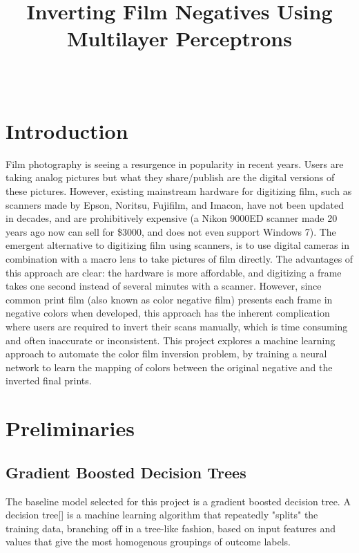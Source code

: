 \documentclass[twoside,11pt]{article}
\begin{document}
\title{Inverting Film Negatives Using Multilayer Perceptrons
}

\author{
		 \\
	}


\maketitle

\section{Introduction}
\label{sec:intro}
Film photography is seeing a resurgence in popularity in recent years. Users are taking analog pictures 
but what they share/publish are the digital versions of these pictures. However, existing mainstream hardware for digitizing 
film, such as scanners made by Epson, Noritsu, Fujifilm, and Imacon, have not been updated in decades, and are prohibitively expensive 
(a Nikon 9000ED scanner made 20 years ago now can sell for \$3000, and does not even support Windows 7).
The emergent alternative to digitizing film using scanners, is to use digital cameras in combination with a macro lens to take pictures 
of film directly. The advantages of this approach are clear: the hardware is more affordable, and digitizing a frame takes one second instead of 
several minutes with a scanner. However, since common print film (also known as color negative film) presents each frame in negative colors when developed, 
this approach has the inherent complication where users are required to invert their scans manually, which is time consuming and often inaccurate or inconsistent.
This project explores a machine learning approach to automate the color film inversion problem, by training a neural network to learn the mapping of colors between 
the original negative and the inverted final prints.

\section{Preliminaries}
\subsection{Gradient Boosted Decision Trees}
The baseline model selected for this project is a gradient boosted decision tree. A decision tree[\cite{breiman1984classification}] is a machine learning 
algorithm that repeatedly "splits" the training data, branching off in a tree-like fashion, based on input features and values 
that give the most homogenous groupings of outcome labels.
\end{document}
